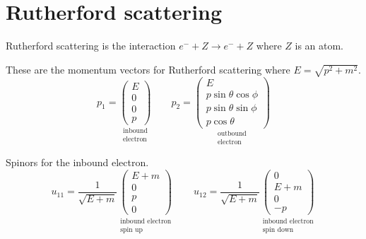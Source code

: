 

\section*{Rutherford scattering}

Rutherford scattering is the interaction
$e^-+Z\rightarrow e^-+Z$ where $Z$ is an atom.

\begin{center}
\end{center}

These are the momentum vectors for Rutherford scattering where $E=\sqrt{p^2+m^2}$.
\begin{equation*}
p_1=\underset{\substack{\text{inbound}\\ \text{electron}}}
{\begin{pmatrix}E\\0\\0\\p\end{pmatrix}}
\qquad
p_2=\underset{\substack{\text{outbound}\\ \text{electron}}}
{\begin{pmatrix}
E\\
p\sin\theta\cos\phi\\
p\sin\theta\sin\phi\\
p\cos\theta
\end{pmatrix}}
\end{equation*}

Spinors for the inbound electron.
\begin{equation*}
u_{11}=\frac{1}{\sqrt{E+m}}
\underset{\substack{\text{inbound electron}\\ \text{spin up}}}
{\begin{pmatrix}E+m\\0\\p\\0\end{pmatrix}}
\qquad
u_{12}=\frac{1}{\sqrt{E+m}}
\underset{\substack{\text{inbound electron}\\ \text{spin down}}}
{\begin{pmatrix}0\\E+m\\0\\-p\end{pmatrix}}
\end{equation*}

